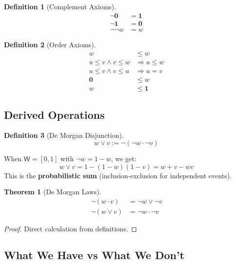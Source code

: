 \documentclass[11pt,a4paper]{article}
\newtheorem{definition}{Definition}[section]
\newtheorem{theorem}{Theorem}[section]
\newcommand{\W}{\mathsf{W}}
\newcommand{\one}{\mathbf{1}}
\newcommand{\zero}{\mathbf{0}}
\newcommand{\negw}{\neg}
\begin{document}
\begin{definition}[Complement Axioms]
\begin{align}
\negw \zero &= \one \tag{neg-zero} \\
\negw \one &= \zero \tag{neg-one} \\
\negw \negw w &= w \tag{involution}
\end{align}
\end{definition}

\begin{definition}[Order Axioms]
\begin{align}
w &\leq w \tag{refl} \\
u \leq v \land v \leq w &\Rightarrow u \leq w \tag{trans} \\
u \leq v \land v \leq u &\Rightarrow u = v \tag{antisym} \\
\zero &\leq w \tag{zero-least} \\
w &\leq \one \tag{one-greatest}
\end{align}
\end{definition}

\subsection{Derived Operations}

\begin{definition}[De Morgan Disjunction]
\[
w \vee v := \negw(\negw w \cdot \negw v)
\]
\end{definition}

When $\W = {[0,1]}$ with $\negw w = 1 - w$, we get:
\[
w \vee v = 1 - (1-w)(1-v) = w + v - wv
\]
This is the \textbf{probabilistic sum} (inclusion-exclusion for independent events).

\begin{theorem}[De Morgan Laws]
\begin{align}
\negw(w \cdot v) &= \negw w \vee \negw v \\
\negw(w \vee v) &= \negw w \cdot \negw v
\end{align}
\end{theorem}

\begin{proof}
Direct calculation from definitions.
\end{proof}

\subsection{What We Have vs What We Don't}
\end{document}
